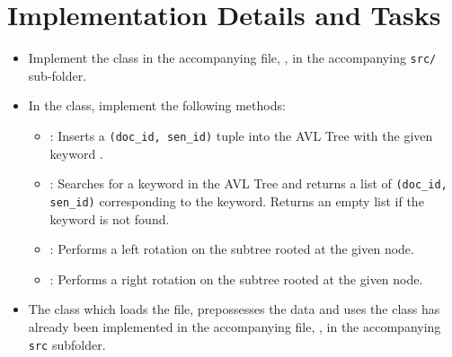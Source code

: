 \documentclass[addpoints]{exam}
\begin{document}
\section*{Implementation Details and Tasks}
\begin{itemize}
  \item Implement the  class in the accompanying file, , in the accompanying \texttt{src/} sub-folder.
  \item In the  class, implement the following methods:
  \begin{itemize}
    \item {}: Inserts a \texttt{(doc\_id, sen\_id)} tuple into the AVL Tree with the given keyword .
    \item {}: Searches for a keyword in the AVL Tree and returns a list of \texttt{(doc\_id, sen\_id)} corresponding to the keyword. 
    Returns an empty list if the keyword is not found.
    \item {}: Performs a left rotation on the subtree rooted at the given node.
    \item {}: Performs a right rotation on the subtree rooted at the given node.
    \end{itemize}
  \item The  class which loads the file, prepossesses the data and uses the  class has already been implemented in the accompanying file, , in the accompanying \texttt{src} subfolder.
\end{itemize}
\end{document}
